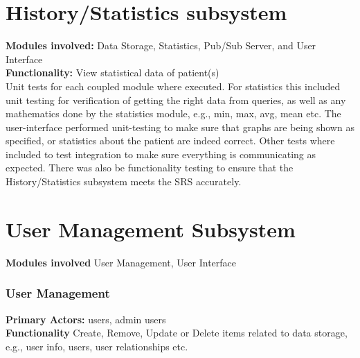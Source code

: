 \documentclass[12pt]{article}
\begin{document}
{	\section{History/Statistics subsystem}
	\textbf{Modules involved:} Data Storage, Statistics, Pub/Sub Server, and User Interface\\
	\textbf{Functionality:} View statistical data of patient(s)\\
	Unit tests for each coupled module where executed. For statistics this included unit testing for verification of getting the right data from queries, as well as any mathematics done by the statistics module, e.g., min, max, avg, mean etc. The user-interface performed unit-testing to make sure that graphs are being shown as specified, or statistics about the patient are indeed correct. Other tests where included to test integration to make sure everything is communicating as expected. There was also be functionality testing to ensure that the History/Statistics subsystem meets the SRS accurately. 

	\section{User Management Subsystem }
	\textbf{Modules involved} User Management, User Interface


	\subsubsection{User Management}

	\textbf{Primary Actors:} users, admin users \\
	\textbf{Functionality} Create, Remove, Update or Delete items related to data storage, e.g., user info, users, user relationships etc.  \\
}
\end{document}
